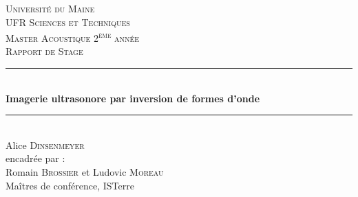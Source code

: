 \documentclass[a4paper,11pt]{report} %
\begin{document}

\begin{titlepage}

\newcommand{\HRule}{\rule{\linewidth}{0.5mm}} %

\center %
 

\textsc{\large Université du Maine \\ UFR Sciences et Techniques}\\[0.5cm] %

\textsc{ \large Master Acoustique 2\textsuperscript{ème} année}\\[3.0cm] %
\textsc{\Large Rapport de Stage}\\[0.5cm] %


\HRule \\[0.7cm]
{ \huge \bfseries Imagerie ultrasonore par inversion de formes d'onde}\\[0.4cm] %
\HRule \\[1.5cm]
 


{\Large Alice \textsc{Dinsenmeyer}}\\[3cm]

\Large encadrée par : \\[1cm]
Romain \textsc{Brossier} et
Ludovic \textsc{Moreau}\\
Maîtres de conférence, ISTerre



\end{titlepage}
\end{document}
